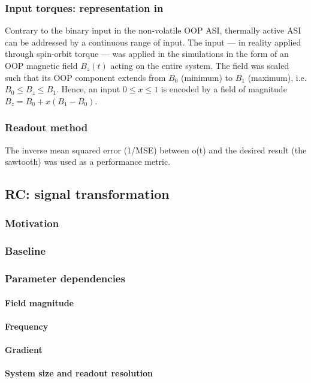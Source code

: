 \subsubsection{Input torques: representation in \hotspice}
Contrary to the binary input in the non-volatile OOP ASI, thermally active ASI can be addressed by a continuous range of input.
The input --- in reality applied through spin-orbit torque --- was applied in the simulations in the form of an OOP magnetic field $B_z(t)$ acting on the entire system.
The field was scaled such that its OOP component extends from $B_0$ (minimum) to $B_1$ (maximum), i.e. $B_0 \leq B_z \leq B_1$.
Hence, an input $0 \leq x \leq 1$ is encoded by a field of magnitude $B_z = B_0 + x (B_1 - B_0)$.

\subsubsection{Readout method}
The inverse mean squared error (1/MSE) between o(t) and the desired result (the sawtooth) was used as a performance metric.

\subsection{RC: signal transformation}
\subsubsection{Motivation} %
\subsubsection{Baseline}
\subsubsection{Parameter dependencies}
\paragraph{Field magnitude}
\paragraph{Frequency}
\paragraph{Gradient}
\paragraph{System size and readout resolution}
